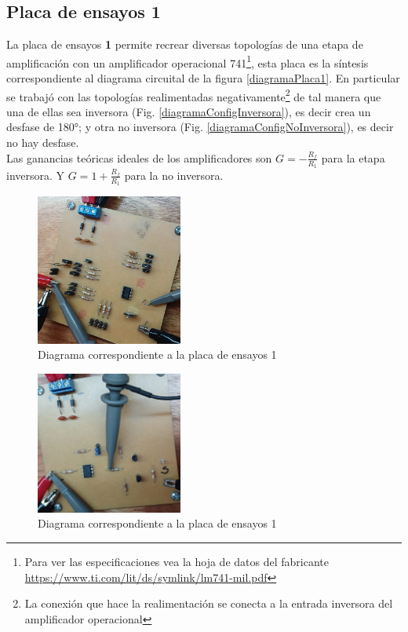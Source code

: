 \documentclass[letterpaper, 10 pt, conference]{ieeeconf}  %
\begin{document}
\subsection{Placa de ensayos 1}
La placa de ensayos \textbf{1} permite recrear diversas topologías de una etapa de amplificación con un amplificador operacional 741\footnote{Para ver las especificaciones vea la hoja de datos del fabricante \href{https://www.ti.com/lit/ds/symlink/lm741-mil.pdf}{https://www.ti.com/lit/ds/symlink/lm741-mil.pdf}}, esta placa es la síntesis correspondiente al diagrama circuital de la figura \ref{diagramaPlaca1}. En particular se trabajó con las topologías realimentadas negativamente\footnote{La conexión que hace la realimentación se conecta a la entrada inversora del amplificador operacional} de tal manera que una de ellas sea inversora (Fig. \ref{diagramaConfigInversora}), es decir crea un desfase de 180°; y otra no inversora (Fig. \ref{diagramaConfigNoInversora}), es decir no hay desfase. \\
\hspace*{3pt} Las ganancias teóricas ideales de los amplificadores son $G=-\frac{R_f}{R_1}$ para la etapa inversora. Y $G=1+\frac{R_f}{R_1}$ para la no inversora.
\begin{figure}[H]
  \centering
  \includegraphics[width=0.43\textwidth]{./placaDePruebas1.jpeg}
  \caption{Diagrama correspondiente a la placa de ensayos 1}
  \label{placaDePruebas1}
\end{figure}
\begin{figure}[H]
  \centering
  \includegraphics[width=0.43\textwidth]{./placaDePruebas2.jpeg}
  \caption{Diagrama correspondiente a la placa de ensayos 1}
  \label{placaDePruebas2}
\end{figure}
\end{document}
